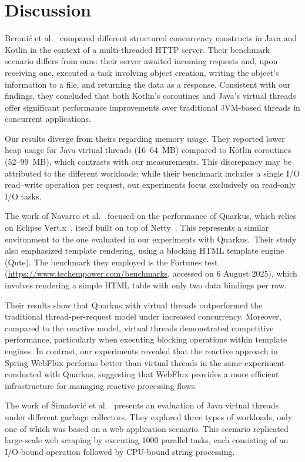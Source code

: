 \documentclass[software,article,accept,pdftex,moreauthors]{Definitions/mdpi}
\begin{document}
\section{{Discussion} 
}\label{s6}

Beronić et al.~\cite{9803765} compared different structured concurrency
constructs in Java and Kotlin in the context of a multi-threaded HTTP server.
Their benchmark scenario differs from ours: their server awaited incoming
requests and, upon receiving one, executed a task involving object creation,
writing the object's information to a file, and returning the data as a
response. Consistent with our findings, they concluded that both Kotlin's
coroutines and Java's virtual threads offer significant performance
improvements over traditional JVM-based threads in concurrent applications.

Our results diverge from theirs regarding memory usage. They reported lower
heap usage for Java virtual threads (16–64~MB) compared to Kotlin coroutines
(52–99~MB), which contrasts with our measurements. This discrepancy may be
attributed to the different workloads: while their benchmark includes a single
I/O read--write operation per request, our experiments focus exclusively on
read-only I/O tasks.

The work of Navarro et al.~\cite{navarro2023considerations} focused on the
performance of Quarkus, which relies on Eclipse Vert.x~\cite{vertx}, itself
built on top of Netty~\cite{netty}. This represents a similar environment to
the one evaluated in our experiments with Quarkus.~Their study also emphasized
template rendering, using a blocking HTML template engine (Qute). The benchmark
they employed is the Fortunes
test ({\url{https://www.techempower.com/benchmarks}}, accessed on 6 August 2025), which involves
rendering a simple HTML table with only two data bindings per row.

Their results show that Quarkus with virtual threads outperformed the
traditional thread-per-request model under increased concurrency. Moreover,
compared to the reactive model, virtual threads demonstrated competitive
performance, particularly when executing blocking operations within template
engines.
In contrast, our experiments revealed that the reactive approach in Spring
WebFlux performs better than virtual threads in the same experiment conducted
with Quarkus, suggesting that WebFlux provides a more efficient infrastructure
for managing reactive processing flows.

The work of Šimatović et al.~\cite{vsimatovic2025evaluating} presents an
evaluation of Java virtual threads under different garbage collectors. They
explored three types of workloads, only one of which was based on a web
application scenario. This scenario replicated large-scale web scraping by
executing 1000 parallel tasks, each consisting of an I/O-bound operation
followed by CPU-bound string processing.
\end{document}
